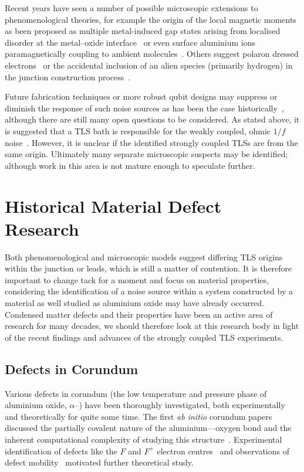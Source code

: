 Recent years have seen a number of possible microscopic extensions to phenomenological theories, for example the origin of the local magnetic moments as been proposed as multiple metal-induced gap states arising from localised disorder at the metal--oxide interface~\cite{Choi2009} or even surface aluminium ions paramagnetically coupling to ambient molecules~\cite{Lee2014}.
Others suggest polaron dressed electrons~\cite{Agarwal2013} or the accidental inclusion of an alien species (primarily hydrogen) in the junction construction process~\cite{Jameson2011, Holder2013, Gordon2014}.

Future fabrication techniques or more robust qubit designs may suppress or diminish the response of such noise sources as has been the case historically~\cite{Vion2002, Martinis2005, Koch2007, Schreier2008, Houck2008}, although there are still many open questions to be considered.
As stated above, it is suggested that a TLS bath is responsible for the weakly coupled, ohmic $1/f$ noise~\cite{Dutta1981}.
However, it is unclear if the identified strongly coupled TLSs are from the same origin.
Ultimately many separate microscopic suspects may be identified; although work in this area is not mature enough to speculate further.

\section{Historical Material Defect Research}

Both phenomenological and microscopic models suggest differing TLS origins within the junction or leads, which is still a matter of contention.
It is therefore important to change tack for a moment and focus on material properties, considering the identification of a noise source within a system constructed by a material as well studied as aluminium oxide may have already occurred.
Condensed matter defects and their properties have been an active area of research for many decades, we should therefore look at this research body in light of the recent findings and advances of the strongly coupled TLS experiments.

\subsection{Defects in Corundum}\label{sec:cordef}
Various defects in corundum (the low temperature and pressure phase of aluminium oxide, $\alpha$--) have been thoroughly investigated, both experimentally and theoretically for quite some time.
The first \emph{ab initio} corundum papers discussed the partially covalent nature of the aluminium---oxygen bond and the inherent computational complexity of studying this structure~\cite{Causa1987}.
Experimental identification of defects like the $F$
and $F^+$ electron centres~\cite{Kotomin1989} and observations of defect mobility~\cite{Kulis1991} motivated further theoretical study.

